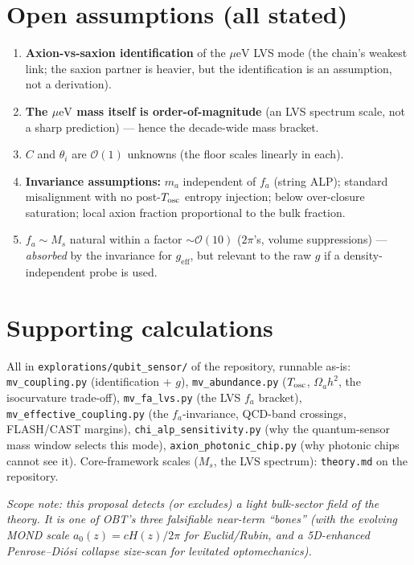 \documentclass[11pt]{article}
\newcommand{\geff}{g_{\mathrm{eff}}}
\newcommand{\ueV}{\mu\mathrm{eV}}
\begin{document}
\section{Open assumptions (all stated)}
\begin{enumerate}
\item \textbf{Axion-vs-saxion identification} of the $\ueV$ LVS mode (the chain's weakest link; the
saxion partner is heavier, but the identification is an assumption, not a derivation).
\item \textbf{The $\ueV$ mass itself is order-of-magnitude} (an LVS spectrum scale, not a sharp
prediction) --- hence the decade-wide mass bracket.
\item $C$ and $\theta_i$ are $\mathcal{O}(1)$ unknowns (the floor scales linearly in each).
\item \textbf{Invariance assumptions:} $m_a$ independent of $f_a$ (string ALP); standard
misalignment with no post-$T_{\rm osc}$ entropy injection; below over-closure saturation; local
axion fraction proportional to the bulk fraction.
\item $f_a \sim M_s$ natural within a factor $\sim\mathcal{O}(10)$ ($2\pi$'s, volume suppressions)
--- \emph{absorbed} by the invariance for $\geff$, but relevant to the raw $g$ if a
density-independent probe is used.
\end{enumerate}

\section{Supporting calculations}
\label{sec:scripts}
All in \texttt{explorations/qubit\_sensor/} of the repository, runnable as-is:
\texttt{mv\_coupling.py} (identification + $g$), \texttt{mv\_abundance.py} ($T_{\rm osc}$,
$\Omega_a h^2$, the isocurvature trade-off), \texttt{mv\_fa\_lvs.py} (the LVS $f_a$ bracket),
\texttt{mv\_effective\_coupling.py} (the $f_a$-invariance, QCD-band crossings, FLASH/CAST margins),
\texttt{chi\_alp\_sensitivity.py} (why the quantum-sensor mass window selects this mode),
\texttt{axion\_photonic\_chip.py} (why photonic chips cannot see it). Core-framework scales ($M_s$,
the LVS spectrum): \texttt{theory.md} on the repository.

\medskip
\noindent\emph{Scope note: this proposal detects (or excludes) a light bulk-sector field of the
theory. It is one of OBT's three falsifiable near-term ``bones'' (with the evolving MOND scale
$a_0(z) = cH(z)/2\pi$ for Euclid/Rubin, and a 5D-enhanced Penrose--Di\'osi collapse size-scan for
levitated optomechanics).}
\end{document}
